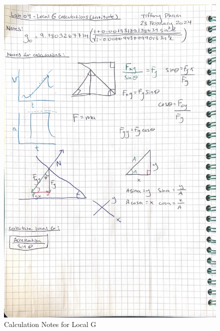 \documentclass[idxtotoc,hyperref,openany]{labbook} %
\begin{document}

\newpage
{}
\begin{figure}[H] %
\begin{center}
\includegraphics[width=0.8\linewidth]{images/Lab.04/LocalGCalculations1.png}
\end{center}
\caption{Calculation Notes for Local G}
\label{fig:Local G Calculations1}
\end{figure}
\end{document}
